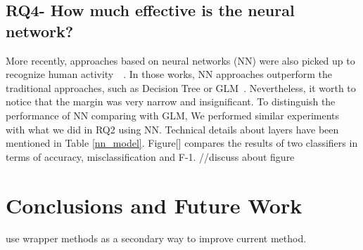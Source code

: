 \subsection{RQ4- How much effective is the neural network?}
More recently, approaches based on neural networks (NN) were also picked up to recognize human activity~\cite{lara2013survey}~\cite{kwapisz2011activity}. In those works, NN approaches outperform the traditional approaches, such as Decision Tree or GLM~\cite{kwapisz2011activity}. Nevertheless, it worth to notice that the margin was very narrow and insignificant. To distinguish the performance of NN comparing with GLM, We performed similar experiments with what we did in RQ2 using NN. Technical details about layers have been mentioned in Table \ref{nn_model}. Figure[] compares the results of two classifiers in terms of accuracy, misclassification and F-1.
//discuss about figure

\section{Conclusions and Future Work}
use wrapper methods as a secondary way to improve current method. 